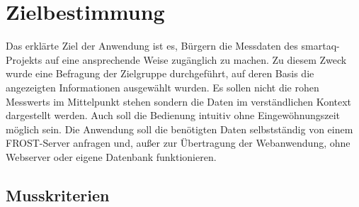 \section{Zielbestimmung}
Das erklärte Ziel der Anwendung ist es, Bürgern die Messdaten des \gls{smartaq}-Projekts auf eine ansprechende Weise zugänglich zu machen.
Zu diesem Zweck wurde eine Befragung der Zielgruppe durchgeführt, auf deren Basis die angezeigten Informationen ausgewählt wurden.
Es sollen nicht die rohen \glspl{Messwert} im Mittelpunkt stehen sondern die Daten im verständlichen Kontext dargestellt werden.
Auch soll die Bedienung intuitiv ohne Eingewöhnungszeit möglich sein.
Die Anwendung soll die benötigten Daten selbstständig von einem \gls{FROST-Server} anfragen und, außer zur Übertragung der \gls{Webanwendung}, ohne \gls{Webserver} oder eigene Datenbank funktionieren.

\subsection{Musskriterien}
\setcounter{counter}{10}

